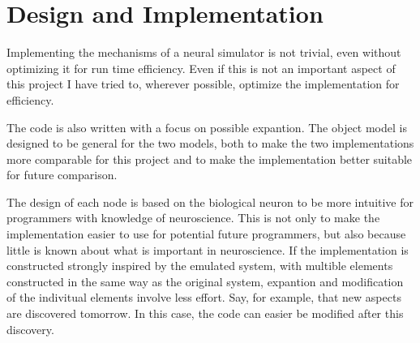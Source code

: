 \documentclass[b5paper,11 pt]{report}
\begin{document}
	
	
\chapter{Design and Implementation} %
Implementing the mechanisms of a neural simulator is not trivial, even without optimizing it for run time efficiency.
Even if this is not an important aspect of this project I have tried to, wherever possible, optimize the implementation for efficiency.


The code is also written with a focus on possible expantion. %
The object model is designed to be general for the two models, both to make the two implementations more comparable for this project and to make the implementation better suitable for future comparison.

The design of each node is based on the biological neuron to be more intuitive for programmers with knowledge of neuroscience. 
This is not only to make the implementation easier to use for potential future programmers, but also because little is known about what is important in neuroscience.
If the implementation is constructed strongly inspired by the emulated system, with multible elements constructed in the same way as the original system, expantion and modification of the indivitual elements involve less effort.
Say, for example, that new aspects are discovered tomorrow. In this case, the code can easier be modified after this discovery.
\end{document}
